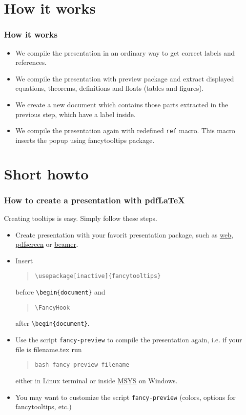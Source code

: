 \documentclass[envcountsect,t,10pt]{beamer}
\begin{document}
\section{How it works}
\begin{frame}
  \frametitle{How it works}
  \begin{itemize}
  \item We compile the presentation in an ordinary way to get correct
    labels and references.
  \item We compile the presentation with preview package and extract
    displayed equations, theorems, definitions and floats (tables and
    figures).
  \item We create a new document which contains those parts extracted
    in the previous step, which have a label inside.
  \item We compile the presentation again with redefined \texttt{ref}
    macro. This macro inserts the popup using fancytooltips package.
  \end{itemize}
\end{frame}

 \section{Short howto}
 \begin{frame}
   \frametitle{How to create a presentation with pdf\LaTeX}
   Creating tooltips is easy. Simply follow these steps.
   \begin{itemize}
   \item Create presentation with your favorit presentation package,
     such as
     \href{http://www.ctan.org/tex-archive/help/Catalogue/entries/acrotex-web.html}{\color{blue}web},
     \href{http://www.ctan.org/tex-archive/macros/latex/contrib/pdfscreen/}{\color{blue}pdfscreen}
     or
     \href{http://www.ctan.org/tex-archive/help/Catalogue/entries/beamer.html}{\color{blue}beamer}.
   \item Insert
     \begin{quote}\upshape\color{red}
       \texttt{\textbackslash usepackage[inactive]\{fancytooltips\}}
     \end{quote}
     before \texttt{\textbackslash begin\{document\}} and
     \begin{quote}\upshape\color{red}
       \texttt{\textbackslash FancyHook}
     \end{quote}
     after \texttt{\textbackslash begin\{document\}}.
   \item Use the script \texttt{fancy-preview} to compile the
     presentation again, i.e. if your file is filename.tex run
     \begin{quote}\upshape\color{darkgreen}
       \texttt{bash fancy-preview filename}
     \end{quote}
     either in Linux terminal or inside
     \href{http://www.mingw.org/wiki/MSYS}{\color{blue}MSYS} on
     Windows.
   \item You may want to customize the script \texttt{fancy-preview}
     (colors, options for fancytooltips, etc.)
   \end{itemize}
 \end{frame}
\end{document}
